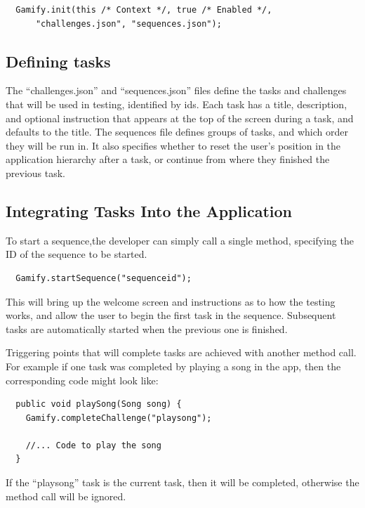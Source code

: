 \begin{verbatim}
  Gamify.init(this /* Context */, true /* Enabled */,
      "challenges.json", "sequences.json");
\end{verbatim}

\subsection{Defining tasks}

The ``challenges.json'' and ``sequences.json'' files define the
tasks and challenges that will be used in testing, identified by
ids. Each task has a title, description, and optional instruction
that appears at the top of the screen during a task, and defaults
to the title. The sequences file defines groups of tasks, and which
order they will be run in. It also specifies whether to reset the
user's position in the application hierarchy after a task, or
continue from where they finished the previous task.

\subsection{Integrating Tasks Into the Application}

To start a sequence,the developer can simply call a single method,
specifying the ID of the sequence to be started.

\begin{verbatim}
  Gamify.startSequence("sequenceid");
\end{verbatim}

This will bring up the welcome screen and instructions as to how
the testing works, and allow the user to begin the first task in
the sequence. Subsequent tasks are automatically started when the
previous one is finished.

Triggering points that will complete tasks are achieved with another
method call. For example if one task was completed by playing a
song in the app, then the corresponding code might look like:

\begin{verbatim}
  public void playSong(Song song) {
    Gamify.completeChallenge("playsong");

    //... Code to play the song
  }
\end{verbatim}

If the ``playsong'' task is the current task, then it will be
completed, otherwise the method call will be ignored.

